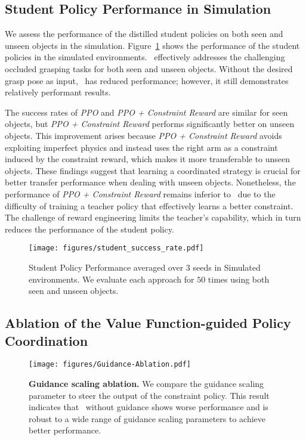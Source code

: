 \subsection{Student Policy Performance in Simulation}
We assess the performance of the distilled student policies on both seen and unseen objects in the simulation.
Figure~\ref{fig:student_perform} shows the performance of the student policies in the simulated environments.
\ourmethod~effectively addresses the challenging occluded grasping tasks for both seen and unseen objects.
Without the desired grasp pose as input, \ourmethod~has reduced performance; however, it still demonstrates relatively performant results.

The success rates of \emph{PPO} and \emph{PPO + Constraint Reward} are similar for seen objects, but \emph{PPO + Constraint Reward} performs significantly better on unseen objects.
This improvement arises because \emph{PPO + Constraint Reward} avoids exploiting imperfect physics and instead uses the right arm as a constraint induced by the constraint reward, which makes it more transferable to unseen objects. 
These findings suggest that learning a coordinated strategy is crucial for better transfer performance when dealing with unseen objects. 
Nonetheless, the performance of \emph{PPO + Constraint Reward} remains inferior to \ourmethod~due to the difficulty of training a teacher policy that effectively learns a better constraint. 
The challenge of reward engineering limits the teacher's capability, which in turn reduces the performance of the student policy.

\begin{figure}[t]
    \centering
    \texttt{[image: figures/student\_success\_rate.pdf]}
    \caption{Student Policy Performance averaged over $3$ seeds in Simulated environments. We evaluate each approach for $50$ times using both seen and unseen objects.}
    \label{fig:student_perform}
    \vspace{-0.4cm}
\end{figure}


\subsection{Ablation of the Value Function-guided Policy Coordination}

\begin{figure}[t]
    \centering
    \texttt{[image: figures/Guidance-Ablation.pdf]}
    \caption{\textbf{Guidance scaling ablation.} We compare the guidance scaling parameter to steer the output of the constraint policy. This result indicates that \ourmethod~without guidance shows worse performance and \ourmethod is robust to a wide range of guidance scaling parameters to achieve better performance.}
    \label{fig:guidance_ablation}
\end{figure}

